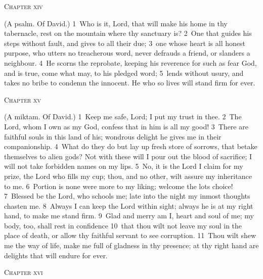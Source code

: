 \documentclass[10pt]{book} %
\begin{document}
\begin{large}\begin{center}\textsc{Chapter xiv}\end{center}\end{large}
(A psalm. Of David.)
\textcolor{benred8}{1}~Who is it, Lord, that will make his home in thy tabernacle, rest on the mountain where thy sanctuary is? \textcolor{benred8}{2}~One that guides his steps without fault, and gives to all their due; \textcolor{benred8}{3}~one whose heart is all honest purpose, who utters no treacherous word, never defrauds a friend, or slanders a neighbour. \textcolor{benred8}{4}~He scorns the reprobate, keeping his reverence for such as fear God, and is true, come what may, to his pledged word; \textcolor{benred8}{5}~lends without usury, and takes no bribe to condemn the innocent. He who so lives will stand firm for ever.
\begin{large}\begin{center}\textsc{Chapter xv}\end{center}\end{large}
(A miktam. Of David.)
\textcolor{benred8}{1}~Keep me safe, Lord; I put my trust in thee. \textcolor{benred8}{2}~The Lord, whom I own as my God, confess that in him is all my good! \textcolor{benred8}{3}~There are faithful souls in this land of his; wondrous delight he gives me in their companionship. \textcolor{benred8}{4}~What do they do but lay up fresh store of sorrows, that betake themselves to alien gods? Not with these will I pour out the blood of sacrifice; I will not take forbidden names on my lips. \textcolor{benred8}{5}~No, it is the Lord I claim for my prize, the Lord who fills my cup; thou, and no other, wilt assure my inheritance to me. \textcolor{benred8}{6}~Portion is none were more to my liking; welcome the lot\textquotesingle s choice!
\textcolor{benred8}{7}~Blessed be the Lord, who schools me; late into the night my inmost thoughts chasten me. \textcolor{benred8}{8}~Always I can keep the Lord within sight; always he is at my right hand, to make me stand firm. \textcolor{benred8}{9}~Glad and merry am I, heart and soul of me; my body, too, shall rest in confidence \textcolor{benred8}{10}~that thou wilt not leave my soul in the place of death, or allow thy faithful servant to see corruption. \textcolor{benred8}{11}~Thou wilt shew me the way of life, make me full of gladness in thy presence; at thy right hand are delights that will endure for ever.
\begin{large}\begin{center}\textsc{Chapter xvi}\end{center}\end{large}
\end{document}
